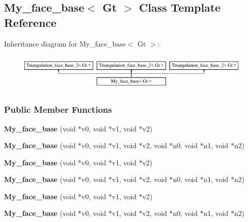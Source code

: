 \hypertarget{classMy__face__base}{}\subsection{My\+\_\+face\+\_\+base$<$ Gt $>$ Class Template Reference}
\label{classMy__face__base}
Inheritance diagram for My\+\_\+face\+\_\+base$<$ Gt $>$\+:\begin{figure}[H]
\begin{center}
\leavevmode
\includegraphics[height=1.786284cm]{classMy__face__base}
\end{center}
\end{figure}
\subsubsection*{Public Member Functions}
\begin{DoxyCompactItemize}
\item 
{\bfseries My\+\_\+face\+\_\+base} (void $\ast$v0, void $\ast$v1, void $\ast$v2)\hypertarget{classMy__face__base_a0af70fd60f0aed9b024b89ea6a81d301}{}\label{classMy__face__base_a0af70fd60f0aed9b024b89ea6a81d301}

\item 
{\bfseries My\+\_\+face\+\_\+base} (void $\ast$v0, void $\ast$v1, void $\ast$v2, void $\ast$n0, void $\ast$n1, void $\ast$n2)\hypertarget{classMy__face__base_aec3abe8ca3bec335a5d865fa8c7fe8f3}{}\label{classMy__face__base_aec3abe8ca3bec335a5d865fa8c7fe8f3}

\item 
{\bfseries My\+\_\+face\+\_\+base} (void $\ast$v0, void $\ast$v1, void $\ast$v2)\hypertarget{classMy__face__base_a0af70fd60f0aed9b024b89ea6a81d301}{}\label{classMy__face__base_a0af70fd60f0aed9b024b89ea6a81d301}

\item 
{\bfseries My\+\_\+face\+\_\+base} (void $\ast$v0, void $\ast$v1, void $\ast$v2, void $\ast$n0, void $\ast$n1, void $\ast$n2)\hypertarget{classMy__face__base_aec3abe8ca3bec335a5d865fa8c7fe8f3}{}\label{classMy__face__base_aec3abe8ca3bec335a5d865fa8c7fe8f3}

\item 
{\bfseries My\+\_\+face\+\_\+base} (void $\ast$v0, void $\ast$v1, void $\ast$v2)\hypertarget{classMy__face__base_a0af70fd60f0aed9b024b89ea6a81d301}{}\label{classMy__face__base_a0af70fd60f0aed9b024b89ea6a81d301}

\item 
{\bfseries My\+\_\+face\+\_\+base} (void $\ast$v0, void $\ast$v1, void $\ast$v2, void $\ast$n0, void $\ast$n1, void $\ast$n2)\hypertarget{classMy__face__base_aec3abe8ca3bec335a5d865fa8c7fe8f3}{}\label{classMy__face__base_aec3abe8ca3bec335a5d865fa8c7fe8f3}

\end{DoxyCompactItemize}
